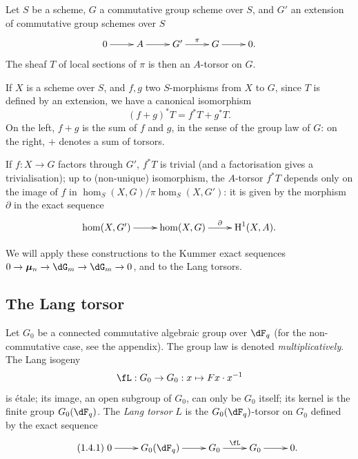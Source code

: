 \subsection{}\label{VI:1-3}

Let $S$ be a scheme, $G$ a commutative group scheme over $S$, and $G'$
an extension of commutative group schemes over $S$
\[\xymatrix{
  0 \ar[r] 
    & A \ar[r] 
    & G' \ar[r]^-\pi 
    & G \ar[r] 
    & 0 \text{.}
}\]
The sheaf $T$ of local sections of $\pi$ is then an $A$-torsor on
$G$.

If $X$ is a scheme over $S$, and $f,g$ two $S$-morphisms from $X$ to $G$,
since $T$ is defined by an extension, we have a canonical
isomorphism 
\begin{equation*}\tag{1.3.1}\label{VI:eq:1-3-1}
  (f+g)^\ast T = f^\ast T + g^\ast T \text{.}
\end{equation*}
On the left, $f+g$ is the sum of $f$ and $g$, in the sense of the group law of $G$:
on the right, $+$ denotes a sum of torsors.

If $f:X\to G$ factors through $G'$, $f^\ast T$ is trivial (and a
factorisation gives a trivialisation); up to (non-unique) isomorphism,
the $A$-torsor $f^\ast T$ depends only on the image of $f$ in
$\hom_S(X,G)/\pi\hom_S(X,G')$: it is given by the morphism $\partial$ in
the exact sequence 
\[\xymatrix{
  \hom(X,G') \ar[r] 
    & \hom(X,G) \ar[r]^-\partial 
    & \h^1(X,A) \text{.}
}\]

We will apply these constructions to the Kummer exact sequences
$0 \to \dmu_n \to \dG_m \to \dG_m \to 0$, and to the Lang torsors. 





\subsection{The Lang torsor}\label{VI:1-4}

Let $G_0$ be a connected commutative algebraic group over $\dF_q$ (for the
non-commutative case, see the appendix). The group law is denoted
\emph{multiplicatively}. The Lang isogeny 
\[
\fL:G_0 \to G_0: x\mapsto F x\cdot x^{-1}
\]
is étale; its image, an open subgroup of $G_0$, can only be
$G_0$ itself; its kernel is the finite group $G_0(\dF_q)$. The \emph{Lang
torsor} $L$ is the $G_0(\dF_q)$-torsor on $G_0$ defined by the exact
sequence 
\begin{equation*}\tag{1.4.1}\label{VI:eq:1-4-1}
\xymatrix{
  0 \ar[r] 
    & G_0(\dF_q) \ar[r] 
    & G_0 \ar[r]^-\fL 
    & G_0 \ar[r] 
    & 0 \text{.}
}
\end{equation*}


